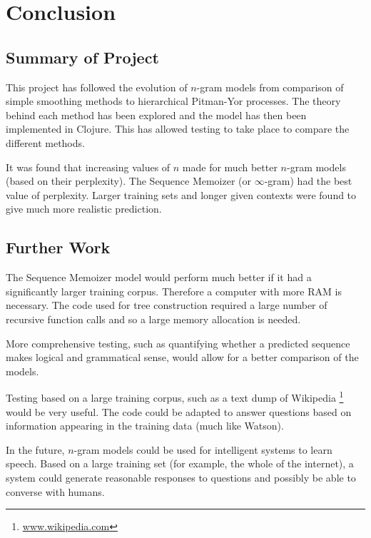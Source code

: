 \chapter{Conclusion}

\section{Summary of Project}

This project has followed the evolution of $n$-gram models from comparison of simple smoothing methods to hierarchical Pitman-Yor processes. The theory behind each method has been explored and the model has then been implemented in Clojure. This has allowed testing to take place to compare the different methods.

It was found that increasing values of $n$ made for much better $n$-gram models (based on their perplexity). The Sequence Memoizer (or $\infty$-gram) had the best value of perplexity. Larger training sets and longer given contexts were found to give much more realistic prediction.

\section{Further Work}

The Sequence Memoizer model would perform much better if it had a significantly larger training corpus. Therefore a computer with more RAM is necessary. The code used for tree construction required a large number of recursive function calls and so a large memory allocation is needed.

More comprehensive testing, such as quantifying whether a predicted sequence makes logical and grammatical sense, would allow for a better comparison of the models.

Testing based on a large training corpus, such as a text dump of Wikipedia \footnote{\url{www.wikipedia.com}} would be very useful. The code could be adapted to answer questions based on information appearing in the training data (much like Watson).

In the future, $n$-gram models could be used for intelligent systems to learn speech. Based on a large training set (for example, the whole of the internet), a system could generate reasonable responses to questions and possibly be able to converse with humans.